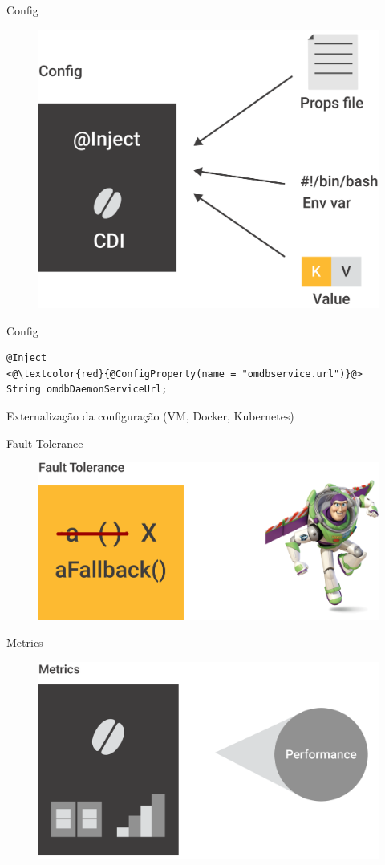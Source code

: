 \documentclass{beamer}
\begin{document}
\begin{frame}{Config}
\begin{figure}
	\centering
	\includegraphics[width=0.75\linewidth]{Images/config}
\end{figure}
\end{frame}




\begin{frame}[fragile]{Config}
\begin{lstlisting}
@Inject
<@\textcolor{red}{@ConfigProperty(name = "omdbservice.url")}@>
String omdbDaemonServiceUrl;
\end{lstlisting}

Externalização da configuração (VM, Docker, Kubernetes)
\end{frame}


\begin{frame}{Fault Tolerance}
\begin{figure}
	\centering
	\includegraphics[width=0.75\linewidth]{Images/faulttolerance}
\end{figure}
\end{frame}

\begin{frame}{Metrics}
\begin{figure}
	\centering
	\includegraphics[width=0.75\linewidth]{Images/metrics}
\end{figure}
\end{frame}
\end{document}
